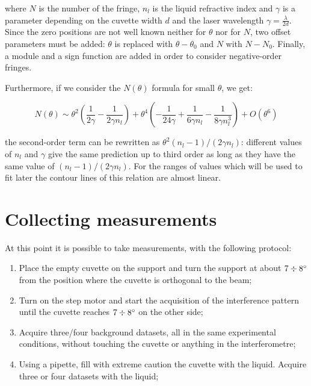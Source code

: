 \documentclass[a4paper, 12pt]{article}
\begin{document}
where \(N\) is the number of the fringe, \(n_l\) is the liquid refractive index and \(\gamma\) is
a parameter depending on the cuvette width \(d\) and the laser wavelength $\gamma = \frac{\lambda}{2d}$.
Since the zero positions are not well known neither for \(\theta\) nor for \(N\), two offset parameters must be added: \(\theta\) is replaced with \(\theta - \theta_0\) and \(N\) with \(N-N_0\). Finally, a module and a sign function are added in order to consider negative-order fringes.

Furthermore, if we consider the $N(\theta)$ formula for small $\theta$, we get:

\begin{equation}
    N(\theta) \sim
    \theta^{2} \left(\frac{1}{2 \gamma} - \frac{1}{2 \gamma n_l}\right) + \theta^{4} \left(- \frac{1}{24 \gamma} + \frac{1}{6 \gamma n_l} - \frac{1}{8 \gamma n^{3}_l}\right) + O\left(\theta^{6}\right)
\end{equation}

the second-order term can be rewritten as $\theta^2 (n_l-1) / (2\gamma n_l)$: different values of $n_l$ and $\gamma$ give the same prediction up to third order as long as they have the same value of $(n_l-1) / (2\gamma n_l)$. For the ranges of values which will be used to fit later the contour lines of this relation are almost linear.

\section{Collecting measurements}
At this point it is possible to take measurements, with the following protocol: 
\begin{enumerate}
\item Place the empty cuvette on the support and turn the support at about $7\divisionsymbol \SI{8}{\degree}$ from the position where the cuvette is orthogonal to the beam; 
\item Turn on the step motor and start the acquisition of the interference pattern until the cuvette reaches $7\divisionsymbol \SI{8}{\degree}$ on the other side; 
\item Acquire three/four background datasets, all in the same experimental conditions, without touching the cuvette or anything in the interferometre; 
\item Using a pipette, fill with extreme caution the cuvette with the liquid. Acquire three or four datasets with the liquid; 

\end{enumerate}
\end{document}
